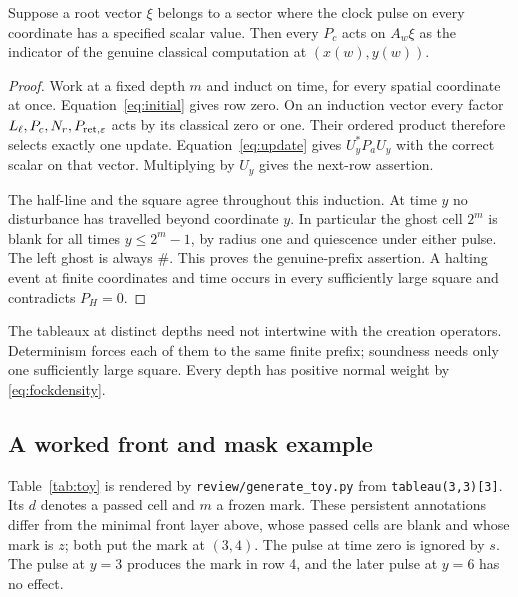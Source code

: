 \begin{lemma}\label{lem:tableau}
Suppose a root vector $\xi$ belongs to a sector where the clock pulse on every coordinate has a specified scalar value. Then every $P_c$ acts on $A_w\xi$ as the indicator of the genuine classical computation at $(x(w),y(w))$.
\end{lemma}
\begin{proof}
Work at a fixed depth $m$ and induct on time, for every spatial coordinate at once. Equation~\eqref{eq:initial} gives row zero. On an induction vector every factor $L_\ell,P_c,N_r,P_{{\rm ret},\varepsilon}$ acts by its classical zero or one. Their ordered product therefore selects exactly one update. Equation~\eqref{eq:update} gives $U_y^*P_aU_y$ with the correct scalar on that vector. Multiplying by $U_y$ gives the next-row assertion.

The half-line and the square agree throughout this induction. At time $y$ no disturbance has travelled beyond coordinate $y$. In particular the ghost cell $2^m$ is blank for all times $y\leq2^m-1$, by radius one and quiescence under either pulse. The left ghost is always $\#$. This proves the genuine-prefix assertion. A halting event at finite coordinates and time occurs in every sufficiently large square and contradicts $P_H=0$.
\end{proof}

The tableaux at distinct depths need not intertwine with the creation operators. Determinism forces each of them to the same finite prefix; soundness needs only one sufficiently large square. Every depth has positive normal weight by \eqref{eq:fockdensity}.

\subsection{A worked front and mask example}\label{sec:toy}
Table~\ref{tab:toy} is rendered by \texttt{review/generate\_toy.py}
from \texttt{tableau(3,3)[3]}.
Its $d$ denotes a passed cell and $m$ a frozen mark. These persistent
annotations differ from the minimal front layer above, whose passed cells
are blank and whose mark is $z$; both put the mark at $(3,4)$.
The pulse at time zero is ignored by $s$. The pulse at $y=3$ produces the
mark in row 4, and the later pulse at $y=6$ has no effect.

